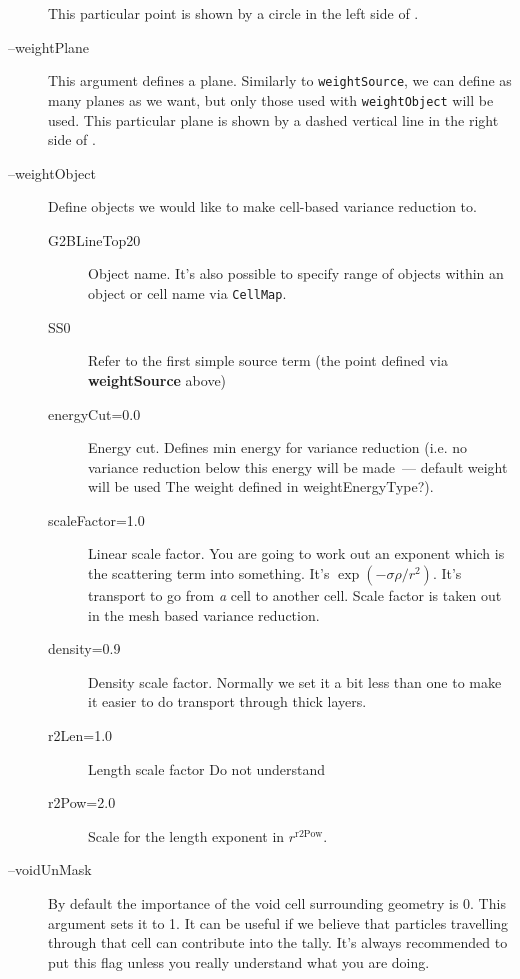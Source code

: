 \begin{description}
  This particular point is shown by a circle in the left side of .
\item[--weightPlane] This argument defines a plane. Similarly to {\tt weightSource}, we can define as many planes as we want,
  but only those used with {\tt weightObject} will be used.
  This particular plane is shown by a dashed vertical line in the right side of .
\item[--weightObject] Define objects we would like to make cell-based variance reduction to.
  \begin{description}
  \item[G2BLineTop20] Object name.  It's also possible to specify range of objects within an object or cell name via {\tt CellMap}.
    \item[SS0] Refer to the first simple source term (the point defined via {\bf weightSource} above)  %
    \item[energyCut=0.0] Energy cut. Defines min energy for variance reduction (i.e. no variance reduction below this energy will be made~--- default weight will be used \alert{The weight defined in weightEnergyType?}).
    \item[scaleFactor=1.0] Linear scale factor. You are going to work out an exponent which is the scattering term into something. It's $\exp(-\sigma \rho / r^2)$.
      It's transport to go from {\em a} cell to another cell. \alert{Scale factor is taken out in the mesh based variance reduction.}
    \item[density=0.9] Density scale factor. Normally we set it a bit less than one to make it easier to do transport through thick layers.
    \item[r2Len=1.0] Length scale factor \alert{Do not understand}
    \item[r2Pow=2.0] Scale for the length exponent in $r^{\text{r2Pow}}$.
  \end{description}

\item[--voidUnMask] By default the importance of the void cell surrounding geometry is 0. This argument sets it to 1.
  It can be useful if we believe that particles travelling through that cell can contribute into the tally.
  It's always recommended to put this flag unless you really understand what you are doing.
\end{description}

